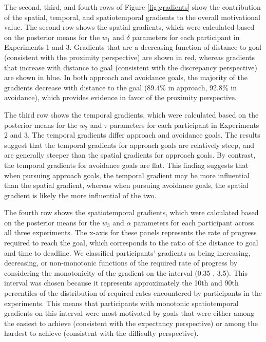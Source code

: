 \documentclass[a4paper,doc,natbib,donotrepeattitle]{apa6}
\begin{document}
The second, third, and fourth rows of Figure \ref{fig:gradients} show the contribution of the spatial, temporal, and spatiotemporal gradients to the overall motivational value. The second row shows the spatial gradients, which were calculated based on the posterior means for the $w_1$ and $\delta$ parameters for each participant in Experiments 1 and 3. Gradients that are a decreasing function of distance to goal (consistent with the proximity perspective) are shown in red, whereas gradients that increase with distance to goal (consistent with the discrepancy perspective) are shown in blue. In both approach and avoidance goals, the majority of the gradients decrease with distance to the goal (89.4\% in approach, 92.8\% in avoidance), which provides evidence in favor of the proximity perspective.

The third row shows the temporal gradients, which were calculated based on the posterior means for the $w_2$ and $\tau$ parameters for each participant in Experiments 2 and 3. The temporal gradients differ approach and avoidance goals. The results suggest that the temporal gradients for approach goals are relatively steep, and are generally steeper than the spatial gradients for approach goals. By contrast, the temporal gradients for avoidance goals are flat. This finding suggests that when pursuing approach goals, the temporal gradient may be more influential than the spatial gradient, whereas when pursuing avoidance goals, the spatial gradient is likely the more influential of the two.

The fourth row shows the spatiotemporal gradients, which were calculated based on the posterior means for the $w_3$ and $\alpha$ parameters for each participant across all three experiments. The x-axis for these panels represents the rate of progress required to reach the goal, which corresponds to the ratio of the distance to goal and time to deadline. We classified participants' gradients as being increasing, decreasing, or non-monotonic functions of the required rate of progress by considering the monotonicity of the gradient on the interval (0.35 , 3.5). This interval was chosen because it represents approximately the 10th and 90th percentiles of the distribution of required rates encountered by participants in the experiments. This means that participants with monotonic spatiotemporal gradients on this interval were most motivated by goals that were either among the easiest to achieve (consistent with the expectancy perspective) or among the hardest to achieve (consistent with the difficulty perspective).
\end{document}
